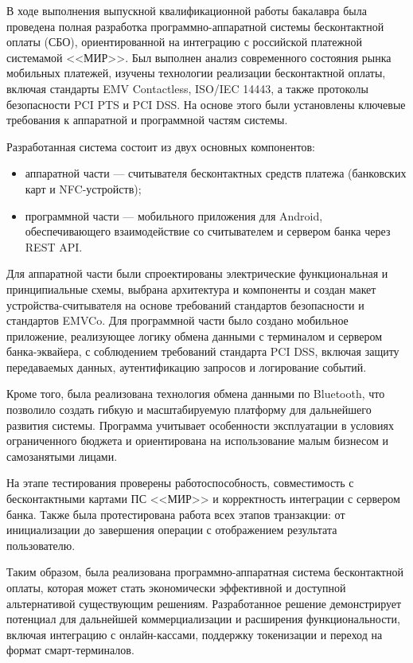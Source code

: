 \newpage


В ходе выполнения выпускной квалификационной работы бакалавра была проведена полная разработка программно-аппаратной системы бесконтактной оплаты (СБО), ориентированной на интеграцию с российской платежной системамой <<МИР>>.
Был выполнен анализ современного состояния рынка мобильных платежей, изучены технологии реализации бесконтактной оплаты, включая стандарты EMV Contactless, ISO/IEC 14443, а также протоколы безопасности PCI PTS и PCI DSS.
На основе этого были установлены ключевые требования к аппаратной и программной частям системы.

Разработанная система состоит из двух основных компонентов:
\begin{itemize}
    \item аппаратной части — считывателя бесконтактных средств платежа (банковских карт и NFC-устройств);
    \item программной части — мобильного приложения для Android, обеспечивающего взаимодействие со считывателем и сервером банка через REST API.
\end{itemize}

Для аппаратной части были спроектированы электрические функциональная и принципиальные схемы, выбрана архитектура и компоненты и создан макет устройства-считывателя на основе требований стандартов безопасности и стандартов EMVCo.
Для программной части было создано мобильное приложение, реализующее логику обмена данными с терминалом и сервером банка-эквайера, с соблюдением требований стандарта PCI DSS, включая защиту передаваемых данных, аутентификацию запросов и логирование событий.

Кроме того, была реализована технология обмена данными по Bluetooth, что позволило создать гибкую и масштабируемую платформу для дальнейшего развития системы.
Программа учитывает особенности эксплуатации в условиях ограниченного бюджета и ориентирована на использование малым бизнесом и самозанятыми лицами.

На этапе тестирования проверены работоспособность, совместимость с бесконтактными картами ПС <<МИР>> и корректность интеграции с сервером банка.
Также была протестирована работа всех этапов транзакции: от инициализации до завершения операции с отображением результата пользователю.

Таким образом, была  реализована программно-аппаратная система бесконтактной оплаты, которая может стать экономически эффективной и доступной альтернативой существующим решениям.
Разработанное решение демонстрирует потенциал для дальнейшей коммерциализации и расширения функциональности, включая интеграцию с онлайн-кассами, поддержку токенизации и переход на формат смарт-терминалов.
